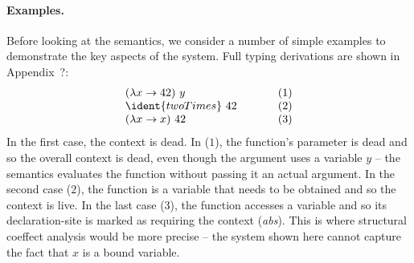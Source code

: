 \paragraph{Examples.}
Before looking at the semantics, we consider a number of simple examples to demonstrate the
key aspects of the system. Full typing derivations are shown in Appendix~?:
%
\begin{equation*}
\begin{array}{lll}
(\lambda x \rightarrow 42)~y &~\hspace{1em}~&(1)\\
\ident{twoTimes}~42          &&(2)\\
(\lambda x \rightarrow x)~42 &&(3)\\
\end{array}
\end{equation*}
%
In the first case, the context is dead. In ($1$), the function's parameter is dead and so the
overall context is dead, even though the argument uses a variable $y$ -- the semantics evaluates 
the function without passing it an actual argument. In the second case ($2$), the function is
a variable that needs to be obtained and so the context is live. In the last case ($3$), the 
function accesses a variable and so its declaration-site is marked as requiring the context 
(\emph{abs}). This is where structural coeffect analysis would be more precise -- the system shown
here cannot capture the fact that $x$ is a bound variable.


